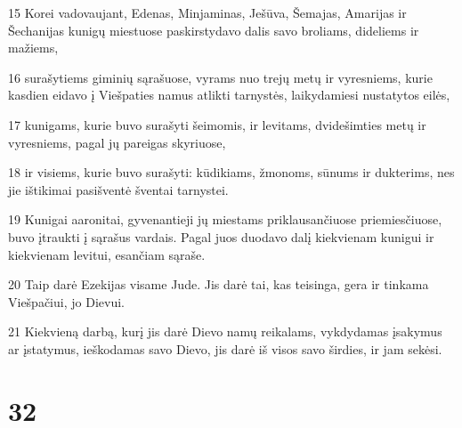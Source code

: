 \par 15 Korei vadovaujant, Edenas, Minjaminas, Ješūva, Šemajas, Amarijas ir Šechanijas kunigų miestuose paskirstydavo dalis savo broliams, dideliems ir mažiems, 
\par 16 surašytiems giminių sąrašuose, vyrams nuo trejų metų ir vyresniems, kurie kasdien eidavo į Viešpaties namus atlikti tarnystės, laikydamiesi nustatytos eilės, 
\par 17 kunigams, kurie buvo surašyti šeimomis, ir levitams, dvidešimties metų ir vyresniems, pagal jų pareigas skyriuose, 
\par 18 ir visiems, kurie buvo surašyti: kūdikiams, žmonoms, sūnums ir dukterims, nes jie ištikimai pasišventė šventai tarnystei. 
\par 19 Kunigai aaronitai, gyvenantieji jų miestams priklausančiuose priemiesčiuose, buvo įtraukti į sąrašus vardais. Pagal juos duodavo dalį kiekvienam kunigui ir kiekvienam levitui, esančiam sąraše. 
\par 20 Taip darė Ezekijas visame Jude. Jis darė tai, kas teisinga, gera ir tinkama Viešpačiui, jo Dievui. 
\par 21 Kiekvieną darbą, kurį jis darė Dievo namų reikalams, vykdydamas įsakymus ar įstatymus, ieškodamas savo Dievo, jis darė iš visos savo širdies, ir jam sekėsi.



\chapter{32}



